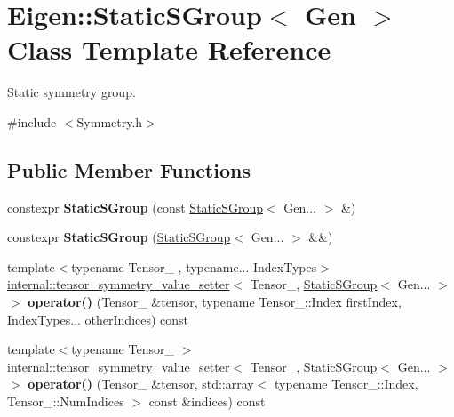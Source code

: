 \hypertarget{class_eigen_1_1_static_s_group}{}\section{Eigen\+:\+:Static\+S\+Group$<$ Gen $>$ Class Template Reference}
\label{class_eigen_1_1_static_s_group}


Static symmetry group.  




{\ttfamily \#include $<$Symmetry.\+h$>$}

\subsection*{Public Member Functions}
\begin{DoxyCompactItemize}
\item 
\mbox{\label{class_eigen_1_1_static_s_group_a893bd13a44b92f748e19358821ab5b4d}} 
constexpr {\bfseries Static\+S\+Group} (const \hyperlink{class_eigen_1_1_static_s_group}{Static\+S\+Group}$<$ Gen... $>$ \&)
\item 
\mbox{\label{class_eigen_1_1_static_s_group_ac645a3ec3432d4d3305071f3c6be5366}} 
constexpr {\bfseries Static\+S\+Group} (\hyperlink{class_eigen_1_1_static_s_group}{Static\+S\+Group}$<$ Gen... $>$ \&\&)
\item 
\mbox{\label{class_eigen_1_1_static_s_group_a3fa803f2cf7032e27943f9cdb8d5c593}} 
{\footnotesize template$<$typename Tensor\+\_\+ , typename... Index\+Types$>$ }\\\hyperlink{class_eigen_1_1internal_1_1tensor__symmetry__value__setter}{internal\+::tensor\+\_\+symmetry\+\_\+value\+\_\+setter}$<$ Tensor\+\_\+, \hyperlink{class_eigen_1_1_static_s_group}{Static\+S\+Group}$<$ Gen... $>$ $>$ {\bfseries operator()} (Tensor\+\_\+ \&tensor, typename Tensor\+\_\+\+::\+Index first\+Index, Index\+Types... other\+Indices) const
\item 
\mbox{\label{class_eigen_1_1_static_s_group_a8b8eb04f4431719716cf2d75f546edc3}} 
{\footnotesize template$<$typename Tensor\+\_\+ $>$ }\\\hyperlink{class_eigen_1_1internal_1_1tensor__symmetry__value__setter}{internal\+::tensor\+\_\+symmetry\+\_\+value\+\_\+setter}$<$ Tensor\+\_\+, \hyperlink{class_eigen_1_1_static_s_group}{Static\+S\+Group}$<$ Gen... $>$ $>$ {\bfseries operator()} (Tensor\+\_\+ \&tensor, std\+::array$<$ typename Tensor\+\_\+\+::\+Index, Tensor\+\_\+\+::\+Num\+Indices $>$ const \&indices) const

\end{DoxyCompactItemize}
